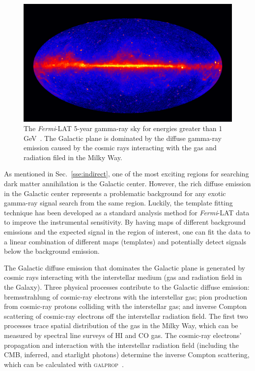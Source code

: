 \documentclass[doublespace,nopageskip]{VTthesis} %
\begin{document}
\begin{figure}[htb]
    \centering
    \includegraphics[width=1\textwidth]{Figures/Intro/Femri_5_year_2500x1407.jpg}
    \caption{The \textit{Fermi}-LAT 5-year gamma-ray sky for energies greater than 1 GeV~\cite{NASAs2013}. The Galactic plane is dominated by the diffuse gamma-ray emission caused by the cosmic rays interacting with the gas and radiation filed in the Milky Way.}
    \label{fig:gamma_sky}
\end{figure}

As mentioned in Sec.~\ref{sse:indirect}, one of the most exciting regions for searching dark matter annihilation is the Galactic center. However, the rich diffuse emission in the Galactic center represents a problematic background for any exotic gamma-ray signal search from the same region. Luckily, the template fitting technique has been developed as a standard analysis method for \textit{Fermi}-LAT data to improve the instrumental sensitivity. By having maps of different background emissions and the expected signal in the region of interest, one can fit the data to a linear combination of different maps (templates) and potentially detect signals below the background emission.

The Galactic diffuse emission that dominates the Galactic plane is generated by cosmic rays interacting with the interstellar medium (gas and radiation field in the Galaxy). Three physical processes contribute to the Galactic diffuse emission: bremsstrahlung of cosmic-ray electrons with the interstellar gas; pion production from cosmic-ray protons colliding with the interstellar gas; and inverse Compton scattering of cosmic-ray electrons off the interstellar radiation field. The first two processes trace spatial distribution of the gas in the Milky Way, which can be measured by spectral line surveys of HI and CO gas. The cosmic-ray electrons' propagation and interaction with the interstellar radiation field (including the CMB, inferred, and starlight photons) determine the inverse Compton scattering, which can be calculated with \textsc{galprop}~\cite{2017ApJ...846...67P}.
\end{document}
